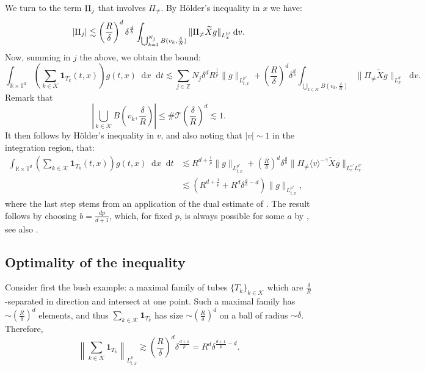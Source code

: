 \documentclass[11pt,a4paper,reqno]{amsart}
\theoremstyle{plain}
\theoremstyle{remark}
\newcommand{\dd}{\mathop{}\!\mathrm{d}}
\begin{document}
We turn to the term ${\rm II}_j$ that involves $\Pi_{\neq}$. By Hölder's inequality in $x$ we have:
\[
    |{\rm II}_j |  \lesssim \left( \frac{R}{\delta} \right)^d \delta^{\frac d b} \int_{\bigcup_{k=1}^{N_j}B(v_k,\frac \delta R)}  \| \Pi_{\neq} \widetilde{X} g \|_{L^{b'}_x} \dd v. 
\]
Now, summing in $j$ the above, we obtain the bound: 
\[
    \int_{\mathbb{R} \times \mathbb{T}^d} \left( \sum_{k \in \mathcal{K}} \mathbf{1}_{T_k}(t,x) \right) g(t,x) \dd x \dd t \lesssim \sum_{j\in \mathbb{Z}} N_j\delta^d R^{\frac{1}{p}} \| g \|_{L^{p'}_{t,x}} +  \left( \frac{R}{\delta} \right)^d \delta^{\frac d b} \int_{\bigcup_{k \in \mathcal{K}} B(v_k,\frac \delta R)}  \| \Pi_{\neq} \widetilde{X} g \|_{L^{b'}_x} \dd v. 
\]
Remark that
\[
    \left\vert \bigcup_{k \in \mathcal{K}} B\left(v_k,\frac \delta R\right) \right\vert \leq \# \mathcal{T} \left(\frac{\delta}{R}\right)^d \lesssim 1.
\]
It then follows by Hölder's inequality in $v$, and also noting that $|v| \sim 1$ in the integration region, that: 
\begin{align*}
    \int_{\mathbb{R} \times \mathbb{T}^d} \left( \sum_{k\in \mathcal{K}} \mathbf{1}_{T_k}(t,x) \right) g(t,x) \dd x \dd t &\lesssim  R^{d+\frac{1}{p}} \| g \|_{L^{p'}_{t,x}} +  \left( \frac{R}{\delta} \right)^d \delta^{\frac d b} \| \Pi_{\neq} \langle v \rangle^{-\gamma}\widetilde{X} g \|_{L^{a'}_vL^{b'}_x} \\ 
    & \lesssim \left(  R^{d+\frac{1}{p}}  + R^d \delta^{\frac{d}{b}-d}\right) \| g \|_{L^{p'}_{t,x}},
\end{align*}
where the last step stems from an application of the dual estimate of . The result follows by choosing $b = \frac{dp}{d+1}$, which, for fixed $p$, is always possible for some $a$ by , see also . 

\subsection{Optimality of the inequality} Consider first the bush example: a maximal family of tubes $\{T_k\}_{k\in \mathcal{K}}$ which are $\frac \delta R$-separated in direction and intersect at one point. Such a maximal family has $\sim  \left( \frac{R}\delta \right)^d$ elements, and thus $\sum_{k\in \mathcal{K}} \mathbf{1}_{T_k}$ has size $\sim \left( \frac{R}\delta \right)^d$ on a ball of radius $\sim \delta$. Therefore,
\[
    \left\| \sum_{k\in \mathcal{K}} \mathbf{1}_{T_k} \right\|_{L^p_{t,x}} \gtrsim \left( \frac{R}\delta \right)^d \delta^{\frac{d+1}{p}} = R^d \delta^{\frac{d+1}{p}-d}.
\]
\end{document}
